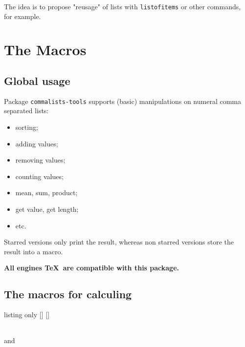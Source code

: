 \documentclass[11pt,a4paper]{ltxdoc}
\begin{document}
\smallskip

The idea is to propose "reusage" of lists with \texttt{listofitems} or other commands, for example.

\section{The Macros}

\subsection{Global usage}

Package \texttt{commalists-tools} supports (basic) manipulations on numeral comma separated lists:

\begin{itemize}
	\item sorting;
	\item adding values;
	\item removing values;
	\item counting values;
	\item mean, sum, product;
	\item get value, get length;
	\item etc.
\end{itemize}

Starred versions only print the result, whereas non starred versions store the result into a macro.

\medskip

\hfill\textbf{All engines \TeX\ are compatible with this package.}\hfill~

\subsection{The macros for calculing}

\begin{DemoCode}{listing only}
[\macro]
[\macro]
\end{DemoCode}

\begin{DemoCode}{}
\\
 and 
\end{DemoCode}
\end{document}
